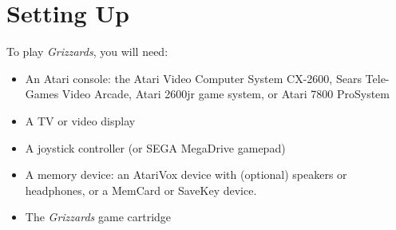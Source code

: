 \documentclass[10pt,twocolumn,openany,article]{memoir}
\begin{document}
\let\cleardoublepage\clearpage

\mainmatter

\tableofcontents

\chapter{Setting Up}\label{Setting Up}

To play \textit{Grizzards}, you will need:

\begin{itemize}
\item An Atari  console: the Atari Video Computer  System CX-2600, Sears
  Tele-Games  Video Arcade,  Atari  2600jr game  system,  or Atari  7800
  ProSystem
\item A TV or video display
\item        A        joystick         controller        (or        SEGA
  \ifdefined{}\fi{}MegaDrive gamepad)
  \ifdefined\NOSAVE\else
\item A  memory device: an  AtariVox device with (optional)  speakers or
  headphones, or a MemCard or SaveKey device.
  \fi
\item The \textit{Grizzards} game cartridge
\end{itemize}
\end{document}
